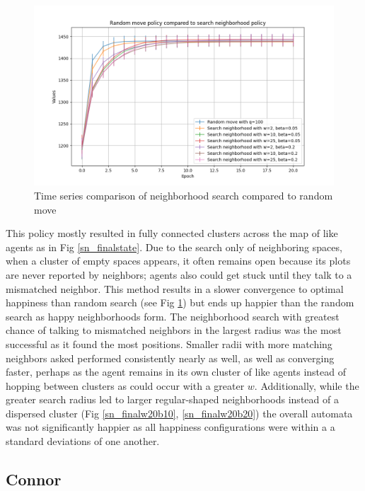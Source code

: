 \documentclass[11pt]{article}
\begin{document}
	\begin{figure}
		\centering
		\includegraphics[width=.5\textwidth]{policies02.png}
		\caption{Time series comparison of neighborhood search compared to random move}
		\label{ns_ts}
	\end{figure}
		\vspace{-.5em} %
	This policy mostly resulted in fully connected clusters across the map of like agents as in Fig \ref{sn_finalstate}. Due to the search only of neighboring spaces, when a cluster of empty spaces appears, it often remains open because its plots are never reported by neighbors; agents also could get stuck until they talk to a mismatched neighbor. This method results in a slower convergence to optimal happiness than random search (see Fig \ref{ns_ts}) but ends up happier than the random search as happy neighborhoods form. The neighborhood search with greatest chance of talking to mismatched neighbors in the largest radius was the most successful as it found the most positions. Smaller radii with more matching neighbors asked performed consistently nearly as well, as well as converging faster, perhaps as the agent remains in its own cluster of like agents instead of hopping between  clusters as could occur with a greater $w$. Additionally, while the greater search radius led to larger regular-shaped neighborhoods instead of a dispersed cluster (Fig \ref{sn_finalw20b10}, \ref{sn_finalw20b20}) the overall automata was not significantly happier as all happiness configurations were within a a standard deviations of one another.
	
	\newpage
	
	\subsection{Connor}
\end{document}
